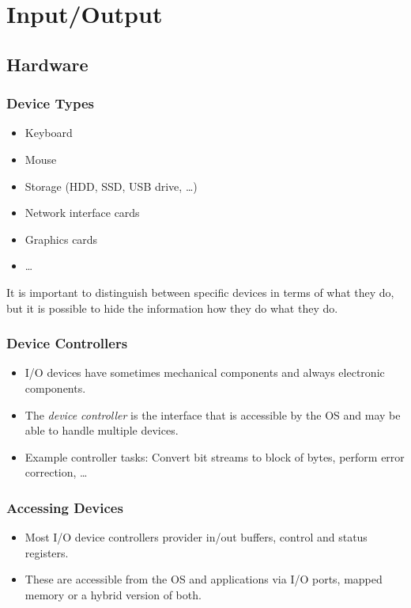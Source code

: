 \documentclass[a4paper, 11pt, accentcolor = tud3b]{tudreport}
\begin{document}
    \chapter{Input/Output}
        \section{Hardware}
            \subsection{Device Types}
                \begin{itemize}
                	\item Keyboard
                	\item Mouse
                	\item Storage (HDD, SSD, USB drive, \dots)
                	\item Network interface cards
                	\item Graphics cards
                	\item \dots
                \end{itemize}
            
	            It is important to distinguish between specific devices in terms of what they do, but it is possible to hide the information how they do what they do.

            \subsection{Device Controllers}
                \begin{itemize}
                	\item I/O devices have sometimes mechanical components and always electronic components.
                	\item The \textit{device controller} is the interface that is accessible by the OS and may be able to handle multiple devices.
                	\item Example controller tasks: Convert bit streams to block of bytes, perform error correction, \dots
                \end{itemize}

            \subsection{Accessing Devices}
                \begin{itemize}
                	\item Most I/O device controllers provider in/out buffers, control and status registers.
                	\item These are accessible from the OS and applications via I/O ports, mapped memory or a hybrid version of both.
                \end{itemize}
            
\end{document}
